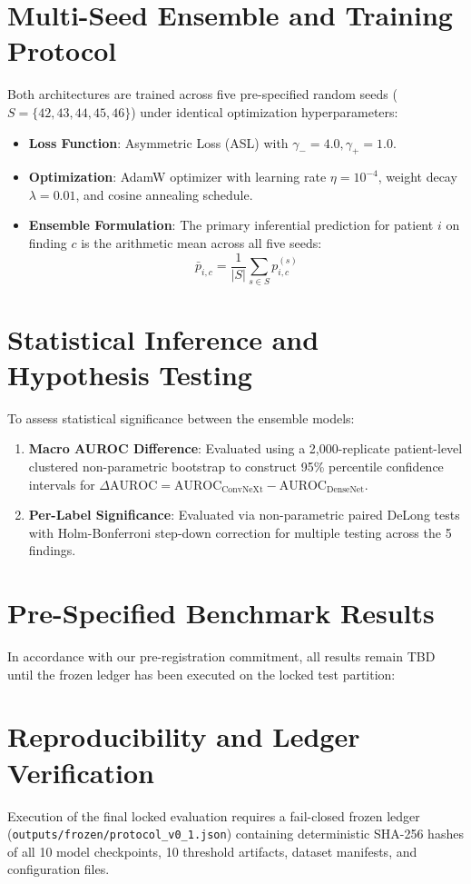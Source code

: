 \documentclass[11pt,a4paper]{article}
\begin{document}
\section{Multi-Seed Ensemble and Training Protocol}
\label{sec:training_protocol}
Both architectures are trained across five pre-specified random seeds ($S = \{42, 43, 44, 45, 46\}$) under identical optimization hyperparameters:
\begin{itemize}
    \item \textbf{Loss Function}: Asymmetric Loss (ASL) with $\gamma_- = 4.0, \gamma_+ = 1.0$.
    \item \textbf{Optimization}: AdamW optimizer with learning rate $\eta = 10^{-4}$, weight decay $\lambda = 0.01$, and cosine annealing schedule.
    \item \textbf{Ensemble Formulation}: The primary inferential prediction for patient $i$ on finding $c$ is the arithmetic mean across all five seeds:
    \begin{equation}
        \bar{p}_{i,c} = \frac{1}{|S|} \sum_{s \in S} p_{i,c}^{(s)}
    \end{equation}
\end{itemize}

\section{Statistical Inference and Hypothesis Testing}
\label{sec:statistical_inference}
To assess statistical significance between the ensemble models:
\begin{enumerate}
    \item \textbf{Macro AUROC Difference}: Evaluated using a 2,000-replicate patient-level clustered non-parametric bootstrap to construct 95\% percentile confidence intervals for $\Delta \text{AUROC} = \text{AUROC}_{\text{ConvNeXt}} - \text{AUROC}_{\text{DenseNet}}$.
    \item \textbf{Per-Label Significance}: Evaluated via non-parametric paired DeLong tests with Holm-Bonferroni step-down correction for multiple testing across the 5 findings.
\end{enumerate}

\section{Pre-Specified Benchmark Results}
\label{sec:results}
In accordance with our pre-registration commitment, all results remain TBD until the frozen ledger has been executed on the locked test partition:

\begin{center}

\end{center}

\section{Reproducibility and Ledger Verification}
\label{sec:reproducibility}
Execution of the final locked evaluation requires a fail-closed frozen ledger (\texttt{outputs/frozen/protocol\_v0\_1.json}) containing deterministic SHA-256 hashes of all 10 model checkpoints, 10 threshold artifacts, dataset manifests, and configuration files.
\end{document}
